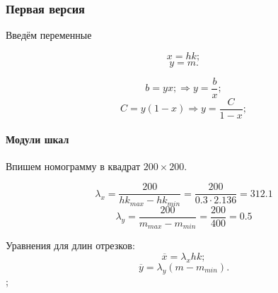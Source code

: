 \subsubsection{Первая версия}

Введём переменные

$$x = hk;$$
$$y = m.$$

$$b = yx; \Rightarrow y = \frac{b}{x};$$
$$C = y(1-x) \Rightarrow y = \frac{C}{1-x};$$

\paragraph{Модули шкал}
Впишем номограмму в квадрат $200 \times 200$.

$$\lambda_x = \frac{200}{hk_{max} - hk_{min}} = \frac{200}{0.3 \cdot 2.136} = 312.1$$
$$\lambda_y = \frac{200}{m_{max}- m_{min}} = \frac{200}{400} = 0.5$$

Уравнения для длин отрезков:
$$\overline{x} = \lambda_x hk;$$
$$\overline{y} = \lambda_y (m - m_{min}).$$;